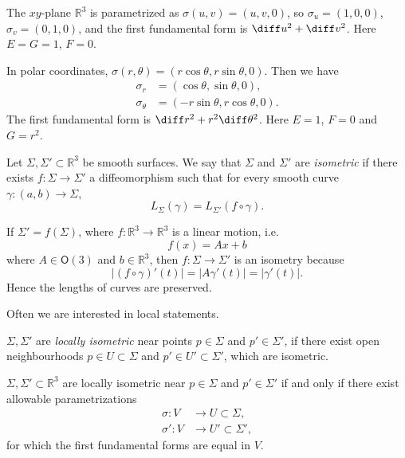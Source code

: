 \documentclass[12pt]{article}
\begin{document}
\begin{exbox}
	The $xy$-plane $\mathbb{R}^3$ is parametrized as $\sigma(u, v) = (u, v, 0)$, so $\sigma_u = (1, 0, 0)$, $\sigma_v = (0, 1, 0)$, and the first fundamental form is $\diff u^2 + \diff v^2$. Here $E = G = 1$, $F = 0$.

	In polar coordinates, $\sigma(r, \theta) = (r \cos \theta, r \sin \theta, 0)$. Then we have
	\begin{align*}
		\sigma_r &= (\cos \theta, \sin \theta, 0),\\
		\sigma_{\theta} &= (- r \sin \theta, r \cos \theta, 0).
	\end{align*}
	The first fundamental form is $\diff r^2 + r^2 \diff \theta^2$. Here $E = 1$, $F = 0$ and $G = r^2$.
\end{exbox}

\begin{definition}
	Let $\Sigma, \Sigma' \subset \mathbb{R}^3$ be smooth surfaces. We say that $\Sigma$ and $\Sigma'$ are \emph{isometric} if there exists $f : \Sigma \to \Sigma'$ a diffeomorphism such that for every smooth curve $\gamma : (a, b) \to \Sigma$,
	\[
	L_{\Sigma}(\gamma) = L_{\Sigma'}(f \circ \gamma)
	.\]
\end{definition}

\begin{exbox}
	If $\Sigma' = f(\Sigma)$, where $f : \mathbb{R}^3 \to \mathbb{R}^3$ is a linear motion, i.e.
	\[
	f(x) = Ax + b
	\]
	where $A \in \mathsf{O}(3)$ and $b \in \mathbb{R}^3$, then $f : \Sigma \to \Sigma'$ is an isometry because
	\[
	|(f \circ \gamma)'(t)| = |A \gamma'(t)| = |\gamma'(t)|
	.\]
	Hence the lengths of curves are preserved.
\end{exbox}

Often we are interested in local statements.

\begin{definition}
	$\Sigma, \Sigma'$ are \emph{locally isometric} near points $p \in \Sigma$ and $p' \in \Sigma'$, if there exist open neighbourhoods $p \in U \subset \Sigma$ and $p' \in U' \subset \Sigma'$, which are isometric.
\end{definition}

\begin{lemma}
	$\Sigma, \Sigma' \subset \mathbb{R}^3$ are locally isometric near $p \in \Sigma$ and $p' \in \Sigma'$ if and only if there exist allowable parametrizations
	\begin{align*}
		\sigma : V &\to U \subset \Sigma, \\
		\sigma' : V &\to U' \subset \Sigma',
	\end{align*}
	for which the first fundamental forms are equal in $V$.
\end{lemma}
\end{document}
